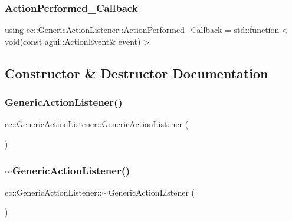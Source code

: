 \subsubsection{\texorpdfstring{Action\+Performed\+\_\+\+Callback}{ActionPerformed\_Callback}}
{\footnotesize\ttfamily using \mbox{\hyperlink{classec_1_1_generic_action_listener_ab58c5e9b4caf14e4d1b1e50ffff5e628}{ec\+::\+Generic\+Action\+Listener\+::\+Action\+Performed\+\_\+\+Callback}} =  std\+::function$<$void(const agui\+::\+Action\+Event\& event)$>$}



\subsection{Constructor \& Destructor Documentation}
\mbox{\label{classec_1_1_generic_action_listener_a70e7395994a0e7ff72e0af59d1f0d20d}} 
\subsubsection{\texorpdfstring{Generic\+Action\+Listener()}{GenericActionListener()}}
{\footnotesize\ttfamily ec\+::\+Generic\+Action\+Listener\+::\+Generic\+Action\+Listener (\begin{DoxyParamCaption}{ }\end{DoxyParamCaption})\hspace{0.3cm}{\ttfamily [explicit]}}

\mbox{\label{classec_1_1_generic_action_listener_a4b840d6f59d0e222121b15ba45bd4c3c}} 
\subsubsection{\texorpdfstring{$\sim$\+Generic\+Action\+Listener()}{~GenericActionListener()}}
{\footnotesize\ttfamily ec\+::\+Generic\+Action\+Listener\+::$\sim$\+Generic\+Action\+Listener (\begin{DoxyParamCaption}{ }\end{DoxyParamCaption})\hspace{0.3cm}{\ttfamily [default]}}



